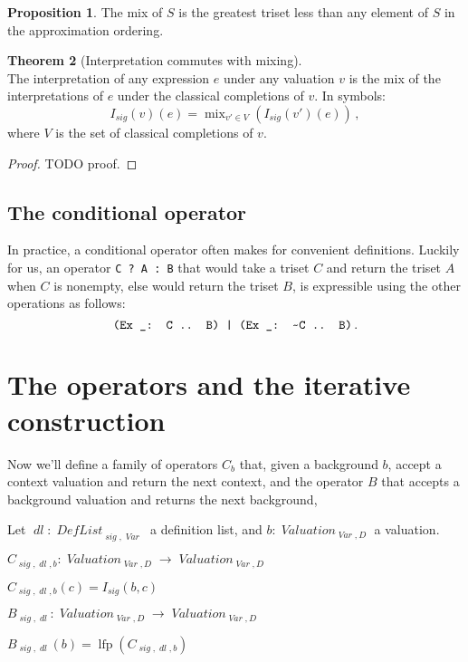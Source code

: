 \documentclass[oneside,12pt]{book}
\theoremstyle{definition}
\newtheorem{theorem}{Theorem}[section]
\newtheorem{proposition}[theorem]{Proposition}
\theoremstyle{remark}
\newcommand{\tde}{\raisebox{0.5ex}{\texttildelow}}
\newcommand\var[1]{\mathop{\mathit{#1}}\nolimits}
\newcommand{\sig}{\var{sig}}
\newcommand{\Var}{\var{Var}}
\DeclareMathOperator{\lfp}{lfp}
\newcommand{\Valuation}{\var{Valuation}}
\newcommand{\DefList}{\var{DefList}}
\newcommand{\dl}{\var{dl}}
\DeclareMathOperator{\mix}{mix}
\begin{document}
\begin{proposition}
  The mix of $S$ is the greatest triset less than any element of $S$ in the
  approximation ordering.
\end{proposition}

\begin{theorem} [Interpretation commutes with mixing] \hfill \\
  The interpretation of any expression $e$ under any valuation $v$ is the mix
  of the interpretations of $e$ under the classical completions of $v$.
  In symbols: \[I_{\sig}(v)(e) = \mix_{v' \in V}(I_{\sig}(v')(e))\,,\]
  where $V$ is the set of classical completions of $v$.
  
\end{theorem}

\begin{proof}
  TODO proof.
\end{proof}

\subsection{The conditional operator}
In practice, a conditional operator often makes for convenient definitions.
Luckily for us, an operator \texttt{C ? A : B} that would take a triset $C$
and return the triset $A$ when $C$ is nonempty, else would return the triset $B$,
is expressible using the other operations as follows:
\[\texttt{(Ex \_: C .. B) | (Ex \_: \tde C .. B)}\,.\]

\section{The operators and the iterative construction}
Now we'll define a family of operators $C_{b}$ that, given a background $b$,
accept a context valuation and return the next context, and the operator $B$ that
accepts a background valuation and returns the next background,

\begin{defBox}
  Let $\dl\colon \DefList_{\sig,\Var}$ a definition list, and
  $b\colon \Valuation_{\Var,D}$ a valuation.
  
  \medskip \noindent $C_{\sig,\dl,b}
    \colon \Valuation_{\Var,D} \to \Valuation_{\Var,D}$
  
  \nopagebreak \smallskip \noindent $C_{\sig,\dl,b}(c) = I_{\sig}(b,c)$
  
  \bigskip \noindent $B_{\sig,\dl}
    \colon \Valuation_{\Var,D} \to \Valuation_{\Var,D}$
  
  \nopagebreak \smallskip \noindent $B_{\sig,\dl}(b) = \lfp(C_{\sig,\dl,b})$
\end{defBox}
\end{document}
